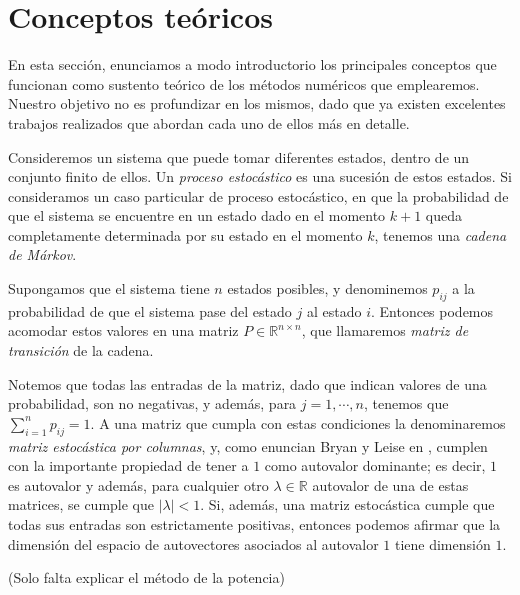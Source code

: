 \section{Conceptos teóricos}

    En esta sección, enunciamos a modo introductorio los principales conceptos que funcionan como sustento teórico de los métodos numéricos que emplearemos. Nuestro objetivo no es profundizar en los mismos, dado que ya existen excelentes trabajos realizados que abordan cada uno de ellos más en detalle.

    Consideremos un sistema que puede tomar diferentes estados, dentro de un conjunto finito de ellos. Un \emph{proceso estocástico} es una sucesión de estos estados. Si consideramos un caso particular de proceso estocástico, en que la probabilidad de que el sistema se encuentre en un estado dado en el momento $k+1$ queda completamente determinada por su estado en el momento $k$, tenemos una \emph{cadena de Márkov}.

    Supongamos que el sistema tiene $n$ estados posibles, y denominemos $p_{ij}$ a la probabilidad de que el sistema pase del estado $j$ al estado $i$. Entonces podemos acomodar estos valores en una matriz $P \in \mathbb{R}^{n \times n}$, que llamaremos \emph{matriz de transición} de la cadena.

    Notemos que todas las entradas de la matriz, dado que indican valores de una probabilidad, son no negativas, y además, para $j = 1, \cdots, n$, tenemos que $\sum_{i=1}^{n} p_{ij} = 1$. A una matriz que cumpla con estas condiciones la denominaremos \emph{matriz estocástica por columnas}, y, como enuncian Bryan y Leise en \cite{Bryan2006}, cumplen con la importante propiedad de tener a $1$ como autovalor dominante; es decir, $1$ es autovalor y además, para cualquier otro $\lambda \in \mathbb{R}$ autovalor de una de estas matrices, se cumple que $|\lambda| < 1$. Si, además, una matriz estocástica cumple que todas sus entradas son estrictamente positivas, entonces podemos afirmar que la dimensión del espacio de autovectores asociados al autovalor $1$ tiene dimensión $1$.

    (Solo falta explicar el método de la potencia)
